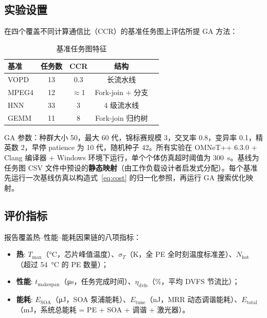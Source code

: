 \documentclass[conference]{IEEEtran}
\begin{document}
\subsection{实验设置}

在四个覆盖不同计算通信比（CCR）的基准任务图上评估所提 GA 方法：

\begin{table}[h]
\centering
\caption{基准任务图特征}
\label{tab:benchmarks}
\begin{tabular}{lcccc}
\toprule
\textbf{基准} & \textbf{任务数} & \textbf{CCR} & \textbf{结构} \\
\midrule
VOPD   & 13 & 0.3  & 长流水线 \\
MPEG4  & 12 & $\approx$1 & Fork-join + 分支 \\
HNN    & 33 & 3    & 4 级流水线 \\
GEMM   & 11 & 8    & Fork-join 归约树 \\
\bottomrule
\end{tabular}
\end{table}

GA 参数：种群大小 50，最大 60 代，锦标赛规模 3，交叉率 0.8，变异率 0.1，精英数 2，早停 patience 为 10 代，随机种子 42。所有实验在 OMNeT++ 6.3.0 + Clang 编译器 + Windows 环境下运行，单个个体仿真超时阈值为 \SI{300}{\second}。基线为任务图 CSV 文件中预设的\textbf{静态映射}（由工作负载设计者启发式分配）。每个基准先运行一次基线仿真以构造式~\eqref{eq:cost} 的归一化参照，再运行 GA 搜索优化映射。

\subsection{评价指标}

报告覆盖热--性能--能耗因果链的八项指标：

\begin{itemize}
\item \textbf{热}: $T_{\max}$（\si{\degreeCelsius}，芯片峰值温度）、$\sigma_T$（K，全 PE 全时刻温度标准差）、$N_{\text{hot}}$（超过 \SI{54}{\degreeCelsius} 的 PE 数量）；
\item \textbf{性能}: $t_{\text{makespan}}$（\si{\micro\second}，任务完成时间）、$\eta_{\text{dvfs}}$（\%，平均 DVFS 节流比）；
\item \textbf{能耗}: $E_{\text{SOA}}$（\si{\micro\joule}，SOA 泵浦能耗）、$E_{\text{tune}}$（\si{\nano\joule}，MRR 动态调谐能耗）、$E_{\text{total}}$（\si{\milli\joule}，系统总能耗 = PE + SOA + 调谐 + 激光器）。
\end{itemize}
\end{document}
